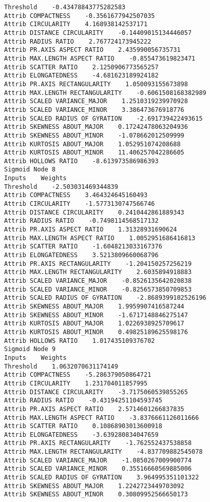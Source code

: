\documentclass[
	article,			%
	11pt,				%
	oneside,			%
	a4paper,			%
	english,			%
	brazil,				%
	sumario=tradicional
	]{abntex2}
\begin{document}
\begin{lstlisting}
Threshold    -0.43478843775282583
Attrib COMPACTNESS    -0.3561677942507035
Attrib CIRCULARITY    4.168938142537171
Attrib DISTANCE CIRCULARITY    -0.14409015134446057
Attrib RADIUS RATIO    2.767724173945222
Attrib PR.AXIS ASPECT RATIO    2.435990056735731
Attrib MAX.LENGTH ASPECT RATIO    -0.855473619823471
Attrib SCATTER RATIO    2.1250906773565257
Attrib ELONGATEDNESS    -4.681623189924182
Attrib PR.AXIS RECTANGULARITY    1.050093155673898
Attrib MAX.LENGTH RECTANGULARITY    -0.6061508168382989
Attrib SCALED VARIANCE_MAJOR    1.2510319239970928
Attrib SCALED VARIANCE_MINOR    3.386473676918776
Attrib SCALED RADIUS OF GYRATION    -2.691739422493615
Attrib SKEWNESS ABOUT_MAJOR    0.17242478063204936
Attrib SKEWNESS ABOUT_MINOR    -1.078662012509999
Attrib KURTOSIS ABOUT_MAJOR    1.052951074208688
Attrib KURTOSIS ABOUT_MINOR    11.406257042286605
Attrib HOLLOWS RATIO    -8.613973586986393
Sigmoid Node 8
Inputs    Weights
Threshold    -2.503031469344839
Attrib COMPACTNESS    3.464324645160493
Attrib CIRCULARITY    -1.5773130747566746
Attrib DISTANCE CIRCULARITY    0.2410442861889343
Attrib RADIUS RATIO    -0.7498114568517132
Attrib PR.AXIS ASPECT RATIO    1.31328931690624
Attrib MAX.LENGTH ASPECT RATIO    1.0052951686416813
Attrib SCATTER RATIO    -1.6048213033167376
Attrib ELONGATEDNESS    3.5213809660068796
Attrib PR.AXIS RECTANGULARITY    -1.204150257256219
Attrib MAX.LENGTH RECTANGULARITY    2.6035894918883
Attrib SCALED VARIANCE_MAJOR    -0.8526135642020838
Attrib SCALED VARIANCE_MINOR    -0.8256573850709853
Attrib SCALED RADIUS OF GYRATION    -2.8689399102526196
Attrib SKEWNESS ABOUT_MAJOR    1.9959907416587244
Attrib SKEWNESS ABOUT_MINOR    -1.6717148846275147
Attrib KURTOSIS ABOUT_MAJOR    1.0226938925709617
Attrib KURTOSIS ABOUT_MINOR    0.49825189625598176
Attrib HOLLOWS RATIO    1.017435109376702
Sigmoid Node 9
Inputs    Weights
Threshold    1.0632070631174149
Attrib COMPACTNESS    -5.286379050864721
Attrib CIRCULARITY    1.231704011857995
Attrib DISTANCE CIRCULARITY    -3.7175060539855265
Attrib RADIUS RATIO    -0.43194251104593745
Attrib PR.AXIS ASPECT RATIO    2.5714601266837835
Attrib MAX.LENGTH ASPECT RATIO    -3.8376661126011666
Attrib SCATTER RATIO    0.10868903013600918
Attrib ELONGATEDNESS    -3.639280834047659
Attrib PR.AXIS RECTANGULARITY    -1.762552437538858
Attrib MAX.LENGTH RECTANGULARITY    -4.837709882545078
Attrib SCALED VARIANCE_MAJOR    -1.0850267009900774
Attrib SCALED VARIANCE_MINOR    0.35516660569885006
Attrib SCALED RADIUS OF GYRATION    3.964995351101322
Attrib SKEWNESS ABOUT_MAJOR    1.2242723449703092
Attrib SKEWNESS ABOUT_MINOR    0.30809952566650173

\end{lstlisting}
\end{document}
